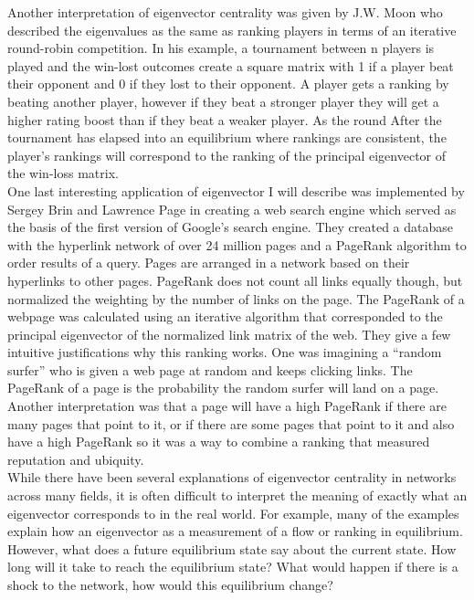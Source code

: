\documentclass{article}
\theoremstyle{definition}
\theoremstyle{remark}
\begin{document}
Another interpretation of eigenvector centrality was given by J.W. Moon who described the eigenvalues as the same as ranking players in terms of an iterative round-robin competition.  In his example, a tournament between n players is played and the win-lost outcomes create a square matrix with 1 if a player beat their opponent and 0 if they lost to their opponent.  A player gets a ranking by beating another player, however if they beat a stronger player they will get a higher rating boost than if they beat a weaker player.  As the round After the tournament has elapsed into an equilibrium where rankings are consistent, the player's rankings will correspond to the ranking of the principal eigenvector of the win-loss matrix.\cite{moon1970generalized}\\

One last interesting application of eigenvector I will describe was implemented by Sergey Brin and Lawrence Page in creating a web search engine which served as the basis of the first version of Google’s search engine.  They created a database with the hyperlink network of over 24 million pages and a PageRank algorithm to order results of a query.  Pages are arranged in a network based on their hyperlinks to other pages.  PageRank does not count all links equally though, but normalized the weighting by the number of links on the page.  The PageRank of a webpage was calculated using an iterative algorithm that corresponded to the principal eigenvector of the normalized link matrix of the web.  They give a few intuitive justifications why this ranking works.  One was imagining a “random surfer” who is given a web page at random and keeps clicking links.  The PageRank of a page is the probability the random surfer will land on a page.  Another interpretation was that a page will have a high PageRank if there are many pages that point to it, or if there are some pages that point to it and also have a high PageRank so it was a way to combine a ranking that measured reputation and ubiquity.\cite{page1999pagerank}\\

While there have been several explanations of eigenvector centrality in networks across many fields, it is often difficult to interpret the meaning of exactly what an eigenvector corresponds to in the real world.  For example, many of the examples explain how an eigenvector as a measurement of a flow or ranking in equilibrium.  However, what does a future equilibrium state say about the current state.  How long will it take to reach the equilibrium state?  What would happen if there is a shock to the network, how would this equilibrium change?  \\
\end{document}
